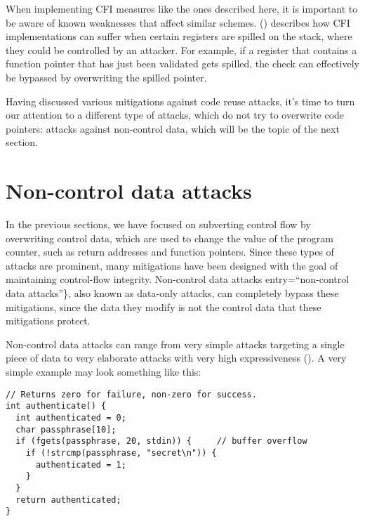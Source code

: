 \documentclass[
  a4paper,
]{report}
\begin{document}
When implementing CFI measures like the ones described here, it is
important to be aware of known weaknesses that affect similar schemes.
() describes how CFI
implementations can suffer when certain registers are spilled on the
stack, where they could be controlled by an attacker. For example, if a
register that contains a function pointer that has just been validated
gets spilled, the check can effectively be bypassed by overwriting the
spilled pointer.

Having discussed various mitigations against code reuse attacks, it's
time to turn our attention to a different type of attacks, which do not
try to overwrite code pointers: attacks against non-control data, which
will be the topic of the next section.

\section{Non-control data attacks}\label{non-control-data-attacks}

In the previous sections, we have focused on subverting control flow by
overwriting \label{__index_entry_57}{control
data}, which are used to change the value of the
program counter, such as return addresses and function pointers. Since
these types of attacks are prominent, many mitigations have been
designed with the goal of maintaining control-flow integrity.
\label{__index_entry_58}{Non-control data
attacks} entry=``non-control data
attacks''\}, also known as
\label{__index_entry_59}{data-only
attacks}, can completely bypass these
mitigations, since the data they modify is not the control data that
these mitigations protect.

Non-control data attacks can range from very simple attacks targeting a
single piece of data to very elaborate attacks with very high
expressiveness (). A very
simple example may look something like this:

\begin{verbatim}
// Returns zero for failure, non-zero for success.
int authenticate() {
  int authenticated = 0;
  char passphrase[10];
  if (fgets(passphrase, 20, stdin)) {     // buffer overflow
    if (!strcmp(passphrase, "secret\n")) {
      authenticated = 1;
    }
  }
  return authenticated;
}
\end{verbatim}
\end{document}

